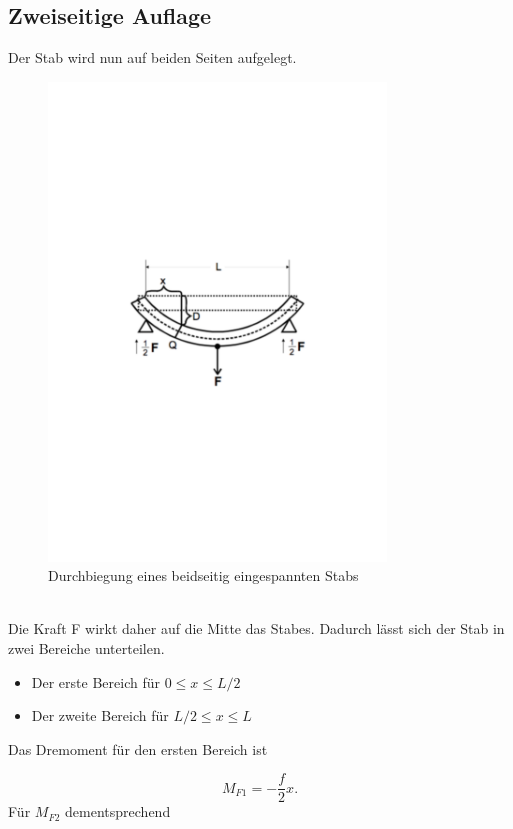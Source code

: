 \subsection{Zweiseitige Auflage}
Der Stab wird nun auf beiden Seiten aufgelegt.
\begin{figure}
  \centering
  \includegraphics[width=0.8\textwidth]{Durchbiegung2.pdf}
  \caption{Durchbiegung eines beidseitig eingespannten Stabs \cite{3}}
\end{figure}
\\Die Kraft F wirkt daher auf die Mitte das Stabes. Dadurch lässt sich der Stab in zwei Bereiche unterteilen.\\
\begin{itemize}
  \item Der erste Bereich für $0\leq x \leq L/2$
  \item Der zweite Bereich für $L/2 \leq x\leq L$
\end{itemize}
Das Dremoment für den ersten Bereich ist

\begin{equation*}
  M_{F1} = -\frac{f}{2}x.
  \label{eqn:mf1}
\end{equation*}
Für $M_{F2}$ dementsprechend

